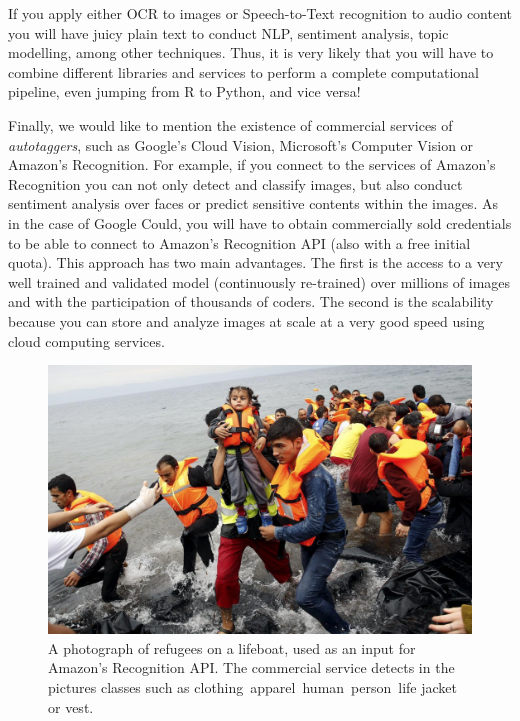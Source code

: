 If you apply either OCR to images or Speech-to-Text recognition to audio content you will have juicy plain text to conduct NLP, sentiment analysis, topic modelling, among other techniques.  Thus, it is very likely that you will have to combine different libraries and services to perform a complete computational pipeline, even jumping from R to Python, and vice versa!

Finally, we would like to mention the existence of commercial services of \textit{autotaggers}, such as Google's Cloud Vision, Microsoft's Computer Vision or Amazon's Recognition. For example, if you connect to the services of Amazon's Recognition you can not only detect and classify images, but also conduct sentiment analysis over faces or predict sensitive contents within the images. As in the case of Google Could, you will have to obtain commercially sold credentials to be able to connect to Amazon's Recognition API (also with a free initial quota). This approach has two main advantages. The first is the access to a very well trained and validated model (continuously re-trained) over millions of images and with the participation of thousands of coders. The second is the scalability because you can store and analyze images at scale at a very good speed using cloud computing services.

\begin{figure}
\centering
\includegraphics[width=0.9\linewidth]{figures/ch15_refugees.png}
\caption{A photograph of refugees on a lifeboat, used as an input for Amazon's Recognition API. The commercial service detects in the pictures classes such as clothing\, apparel\, human\, person\, life jacket or vest.}
\label{fig:refugees}
\end{figure}

